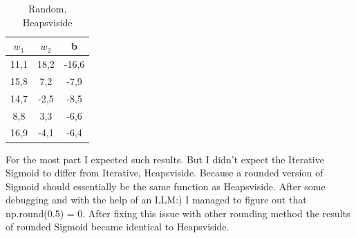 \documentclass{article}
\begin{document}
        \begin{table}[H]
        \centering
        \caption{Random, Heapsviside}
        \begin{tabular}{|c|c|c|}
        \hline
        $w_{1}$ & $w_{2}$ & b\\
        \hline
        11,1 & 18,2 & -16,6 \\
        \hline
        15,8 & 7,2 & -7,9 \\
        \hline
        14,7 & -2,5 & -8,5 \\
        \hline
        8,8 & 3,3 & -6,6 \\
        \hline
        16,9 & -4,1 & -6,4 \\
        \hline
        \end{tabular}
        \end{table}

        For the most part I expected such results. But I didn't expect the Iterative Sigmoid to differ from Iterative, Heapsviside. Because a rounded version of Sigmoid should essentially be the same function as Heapsviside. After some debugging and with the help of an LLM:) I managed to figure out that np.round(0.5) = 0. After fixing this issue with other rounding method the results of rounded Sigmoid became identical to Heapsviside.
\end{document}
